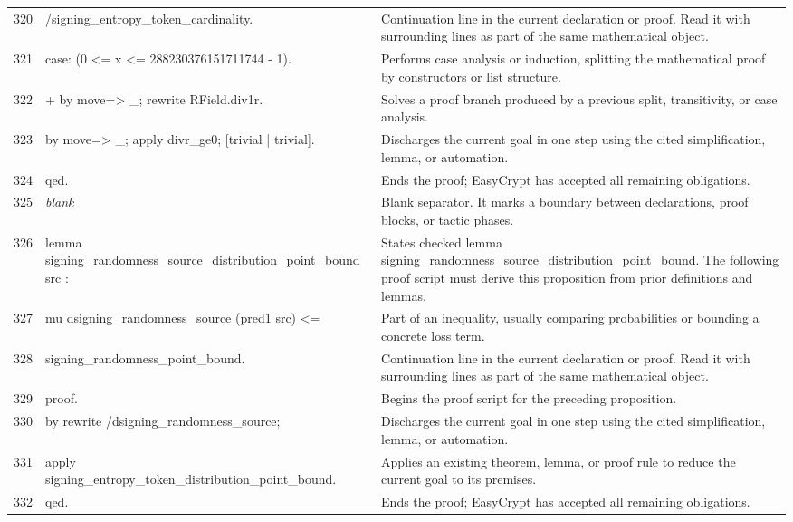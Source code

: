 \documentclass[10pt]{article}
\begin{document}
\begin{longtable}{r L{0.53\textwidth} L{0.37\textwidth}}
320 & {\ttfamily\scriptsize         /signing\_entropy\_token\_cardinality.} & Continuation line in the current declaration or proof.  Read it with surrounding lines as part of the same mathematical object. \\
321 & {\ttfamily\scriptsize case: (0 <= x <= 288230376151711744 - 1).} & Performs case analysis or induction, splitting the mathematical proof by constructors or list structure. \\
322 & {\ttfamily\scriptsize + by move=> \_; rewrite RField.div1r.} & Solves a proof branch produced by a previous split, transitivity, or case analysis. \\
323 & {\ttfamily\scriptsize by move=> \_; apply divr\_ge0; [trivial | trivial].} & Discharges the current goal in one step using the cited simplification, lemma, or automation. \\
324 & {\ttfamily\scriptsize qed.} & Ends the proof; EasyCrypt has accepted all remaining obligations. \\
325 & {\ttfamily\scriptsize \emph{blank}} & Blank separator.  It marks a boundary between declarations, proof blocks, or tactic phases. \\
326 & {\ttfamily\scriptsize lemma signing\_randomness\_source\_distribution\_point\_bound src :} & States checked lemma signing\_randomness\_source\_distribution\_point\_bound.  The following proof script must derive this proposition from prior definitions and lemmas. \\
327 & {\ttfamily\scriptsize   mu dsigning\_randomness\_source (pred1 src) <=} & Part of an inequality, usually comparing probabilities or bounding a concrete loss term. \\
328 & {\ttfamily\scriptsize   signing\_randomness\_point\_bound.} & Continuation line in the current declaration or proof.  Read it with surrounding lines as part of the same mathematical object. \\
329 & {\ttfamily\scriptsize proof.} & Begins the proof script for the preceding proposition. \\
330 & {\ttfamily\scriptsize by rewrite /dsigning\_randomness\_source;} & Discharges the current goal in one step using the cited simplification, lemma, or automation. \\
331 & {\ttfamily\scriptsize    apply signing\_entropy\_token\_distribution\_point\_bound.} & Applies an existing theorem, lemma, or proof rule to reduce the current goal to its premises. \\
332 & {\ttfamily\scriptsize qed.} & Ends the proof; EasyCrypt has accepted all remaining obligations. \\

\end{longtable}
\end{document}
